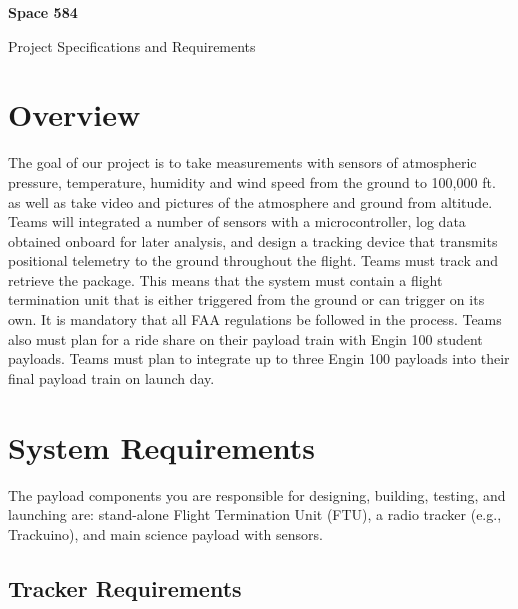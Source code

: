 \documentclass[11pt]{article}
\begin{document}
\begin{center}
{\bf \Large Space 584 

Project Specifications and Requirements
}
\end{center}

\section{Overview}

The goal of our project is to take measurements with sensors of
atmospheric pressure, temperature, humidity and wind speed from the
ground to 100,000 ft. as well as take video and pictures of the
atmosphere and ground from altitude. Teams will integrated a number of
sensors with a microcontroller, log data obtained onboard for later
analysis, and design a tracking device that transmits positional
telemetry to the ground throughout the flight.  Teams must track and
retrieve the package.  This means that the system must contain a
flight termination unit that is either triggered from the ground or
can trigger on its own.  It is mandatory that all FAA regulations be
followed in the process.  Teams also must plan for a ride share on
their payload train with Engin 100 student payloads.  Teams must plan
to integrate up to three Engin 100 payloads into their final payload
train on launch day.

\section{System Requirements}

The payload components you are responsible for designing, building,
testing, and launching are: stand-alone Flight Termination Unit (FTU),
a radio tracker (e.g., Trackuino), and main science payload with
sensors.

\subsection{Tracker Requirements}
\end{document}
